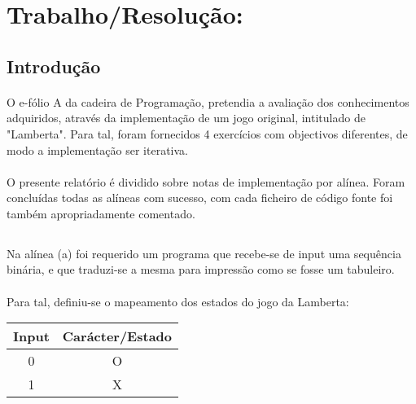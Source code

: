 \section*{Trabalho/Resolução:}

\subsection*{Introdução}

\paragraph{}O e-fólio A da cadeira de Programação, pretendia a avaliação dos
conhecimentos adquiridos, através da implementação de um jogo original,
intitulado de "Lamberta". Para tal, foram fornecidos 4 exercícios com
objectivos diferentes, de modo a implementação ser iterativa.

\paragraph{}O presente relatório é dividido sobre notas de implementação por
alínea. Foram concluídas todas as alíneas com sucesso, com cada ficheiro de
código fonte foi também apropriadamente comentado.

\subsection{}

\paragraph{} Na alínea (a) foi requerido um programa que recebe-se de
input uma sequência binária, e que traduzi-se a mesma para impressão como se
fosse um tabuleiro.

\paragraph{} Para tal, definiu-se o mapeamento dos estados do jogo da
Lamberta:

\begin{center}
\begin{tabular}{c|c}
	Input & Carácter/Estado \\
	\hline
	0 & O \\
	1 & X \\
\end{tabular}
\end{center}

